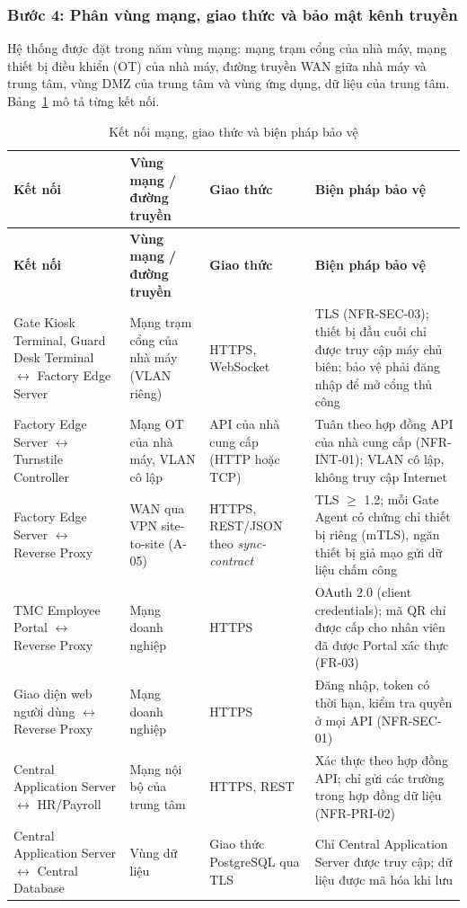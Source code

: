 \subsubsection{Bước 4: Phân vùng mạng, giao thức và bảo mật kênh truyền}\label{sec:physical-step4}
Hệ thống được đặt trong năm vùng mạng: mạng trạm cổng của nhà máy, mạng thiết bị điều khiển (OT) của nhà máy, đường truyền WAN giữa nhà máy và trung tâm, vùng DMZ của trung tâm và vùng ứng dụng, dữ liệu của trung tâm. Bảng~\ref{tab:network} mô tả từng kết nối.

\begingroup
\small
\renewcommand{\arraystretch}{1.3}
\begin{longtable}{|>{\raggedright\arraybackslash}p{3.3cm}|>{\raggedright\arraybackslash}p{3.3cm}|>{\raggedright\arraybackslash}p{2.6cm}|>{\raggedright\arraybackslash}p{5.6cm}|}
\caption{Kết nối mạng, giao thức và biện pháp bảo vệ}\label{tab:network}\\
\hline
\textbf{Kết nối} & \textbf{Vùng mạng / đường truyền} & \textbf{Giao thức} & \textbf{Biện pháp bảo vệ} \\
\hline
\endfirsthead
\hline
\textbf{Kết nối} & \textbf{Vùng mạng / đường truyền} & \textbf{Giao thức} & \textbf{Biện pháp bảo vệ} \\
\hline
\endhead
\hline
\endfoot
\endlastfoot
Gate Kiosk Terminal, Guard Desk Terminal $\leftrightarrow$ Factory Edge Server & Mạng trạm cổng của nhà máy (VLAN riêng) & HTTPS, WebSocket & TLS (NFR-SEC-03); thiết bị đầu cuối chỉ được truy cập máy chủ biên; bảo vệ phải đăng nhập để mở cổng thủ công \\
\hline
Factory Edge Server $\leftrightarrow$ Turnstile Controller & Mạng OT của nhà máy, VLAN cô lập & API của nhà cung cấp (HTTP hoặc TCP) & Tuân theo hợp đồng API của nhà cung cấp (NFR-INT-01); VLAN cô lập, không truy cập Internet \\
\hline
Factory Edge Server $\leftrightarrow$ Reverse Proxy & WAN qua VPN site-to-site (A-05) & HTTPS, REST/JSON theo \textit{sync-contract} & TLS $\ge$ 1.2; mỗi Gate Agent có chứng chỉ thiết bị riêng (mTLS), ngăn thiết bị giả mạo gửi dữ liệu chấm công \\
\hline
TMC Employee Portal $\leftrightarrow$ Reverse Proxy & Mạng doanh nghiệp & HTTPS & OAuth 2.0 (client credentials); mã QR chỉ được cấp cho nhân viên đã được Portal xác thực (FR-03) \\
\hline
Giao diện web người dùng $\leftrightarrow$ Reverse Proxy & Mạng doanh nghiệp & HTTPS & Đăng nhập, token có thời hạn, kiểm tra quyền ở mọi API (NFR-SEC-01) \\
\hline
Central Application Server $\leftrightarrow$ HR/Payroll & Mạng nội bộ của trung tâm & HTTPS, REST & Xác thực theo hợp đồng API; chỉ gửi các trường trong hợp đồng dữ liệu (NFR-PRI-02) \\
\hline
Central Application Server $\leftrightarrow$ Central Database & Vùng dữ liệu & Giao thức PostgreSQL qua TLS & Chỉ Central Application Server được truy cập; dữ liệu được mã hóa khi lưu \\
\hline
\end{longtable}
\endgroup

